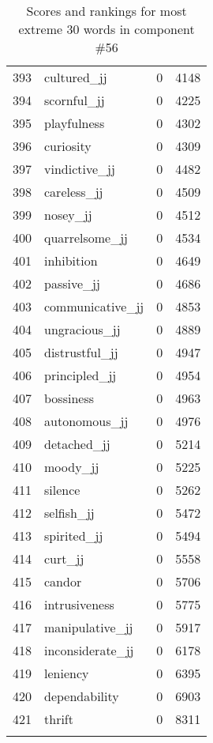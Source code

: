 \begin{longtable}[!htbp]{| rlr@{.}l |}
    393 & cultured\_jj & 0 & 4148 \\
    394 & scornful\_jj & 0 & 4225 \\
    395 & playfulness & 0 & 4302 \\
    396 & curiosity & 0 & 4309 \\
    397 & vindictive\_jj & 0 & 4482 \\
    398 & careless\_jj & 0 & 4509 \\
    399 & nosey\_jj & 0 & 4512 \\
    400 & quarrelsome\_jj & 0 & 4534 \\
    401 & inhibition & 0 & 4649 \\
    402 & passive\_jj & 0 & 4686 \\
    403 & communicative\_jj & 0 & 4853 \\
    404 & ungracious\_jj & 0 & 4889 \\
    405 & distrustful\_jj & 0 & 4947 \\
    406 & principled\_jj & 0 & 4954 \\
    407 & bossiness & 0 & 4963 \\
    408 & autonomous\_jj & 0 & 4976 \\
    409 & detached\_jj & 0 & 5214 \\
    410 & moody\_jj & 0 & 5225 \\
    411 & silence & 0 & 5262 \\
    412 & selfish\_jj & 0 & 5472 \\
    413 & spirited\_jj & 0 & 5494 \\
    414 & curt\_jj & 0 & 5558 \\
    415 & candor & 0 & 5706 \\
    416 & intrusiveness & 0 & 5775 \\
    417 & manipulative\_jj & 0 & 5917 \\
    418 & inconsiderate\_jj & 0 & 6178 \\
    419 & leniency & 0 & 6395 \\
    420 & dependability & 0 & 6903 \\
    421 & thrift & 0 & 8311 \\
    \hline
    \caption{Scores and rankings for most extreme 30 words in component \#56} \\
\end{longtable}
